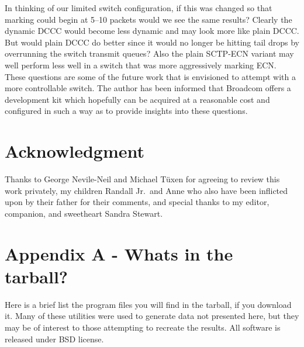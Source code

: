 \documentclass[12pt]{article}
\begin{document}
In thinking of our limited switch configuration, if this was changed so that marking could begin at 5--10 packets
would we see the same results? Clearly the dynamic DCCC would become less dynamic and may look more
like plain DCCC. But would plain DCCC do better since it would no longer be hitting tail drops 
by overrunning the switch transmit queues? Also the plain SCTP-ECN variant may well perform less well 
in a switch that was more aggressively marking ECN. These questions are some of the future work that
is envisioned to attempt with a more controllable switch. The author has been informed that Broadcom
offers a development kit which hopefully can be acquired at a reasonable cost and configured in such
a way as to provide insights into these questions.
     

\section*{Acknowledgment}

Thanks to George Nevile-Neil and Michael T\"uxen for agreeing to review this work privately, my children Randall Jr.~and Anne who also have been inflicted upon by their father for their comments, and special thanks to my editor,
companion, and sweetheart Sandra Stewart.

\section*{Appendix A - Whats in the tarball?}
Here is a brief list the program files you will find in the tarball, if you download it. Many of
these utilities were used to generate data not presented here, but they may be of interest
to those attempting to recreate the results. All software is released under BSD license.
\end{document}
